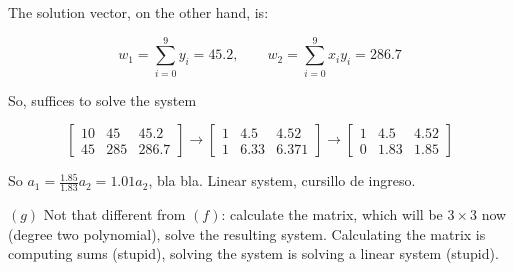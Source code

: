 \documentclass[12pt]{article}
\theoremstyle{definition}
\begin{document}
The solution vector, on the other hand, is: 

\begin{equation*}
    w_{1} = \sum_{i=0}^9 y_i = 45.2, \qquad w_2 = \sum_{i=0}^9 x_i y_i = 286.7
\end{equation*}

So, suffices to solve the system 

\begin{equation*}
    \begin{bmatrix} 
    10 & 45 & 45.2 \\ 
    45 & 285 & 286.7
    \end{bmatrix} \to \begin{bmatrix} 
    1 & 4.5 & 4.52 \\ 
    1 & 6.33 & 6.371 
    \end{bmatrix} \to \begin{bmatrix} 
    1 & 4.5 & 4.52\\
    0 & 1.83 & 1.85 
    \end{bmatrix} 
\end{equation*}

So $a_1 = \frac{1.85}{1.83} a_2 = 1.01 a_2$, bla bla. Linear system, cursillo de
ingreso.

$(g)$ Not that different from $(f)$: calculate the matrix, which will be
$3\times 3$ now (degree two polynomial), solve the resulting system.
Calculating the matrix is computing sums (stupid), solving the system is solving
a linear system (stupid).
\end{document}
